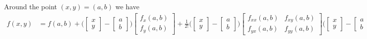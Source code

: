 Around the point $(x, y) = (a, b)$ we have
\begin{align*}
f(x, y) &= f(a, b) + 
\Bigg( 
	\begin{bmatrix}
    	x \\
    	y
	\end{bmatrix}
	-
	\begin{bmatrix}
    	a \\
    	b
	\end{bmatrix}
\Bigg)
	\begin{bmatrix}
    	f_x(a,b) \\
    	f_y(a,b)
	\end{bmatrix}
+
\frac{1}{2!}
\Bigg( 
	\begin{bmatrix}
    	x \\
    	y
	\end{bmatrix}
	-
	\begin{bmatrix}
    	a \\
    	b
	\end{bmatrix}
\Bigg)
	\begin{bmatrix}
    	f_{xx}(a,b) & f_{xy}(a,b)\\
    	f_{yx}(a,b) & f_{yy}(a,b)
	\end{bmatrix}
\Bigg( 
	\begin{bmatrix}
    	x \\
    	y
	\end{bmatrix}
	-
	\begin{bmatrix}
    	a \\
    	b
	\end{bmatrix}
\Bigg)
\end{align*}





















